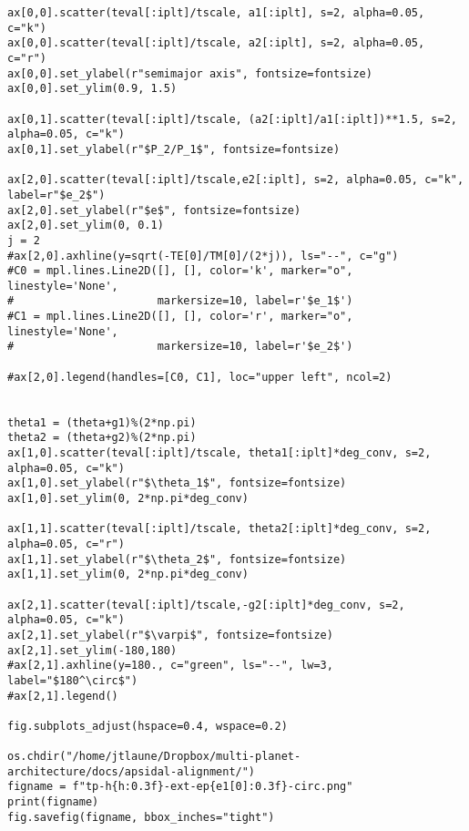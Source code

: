 \documentclass[11pt]{article}
\begin{document}
\begin{verbatim}
ax[0,0].scatter(teval[:iplt]/tscale, a1[:iplt], s=2, alpha=0.05, c="k")
ax[0,0].scatter(teval[:iplt]/tscale, a2[:iplt], s=2, alpha=0.05, c="r")
ax[0,0].set_ylabel(r"semimajor axis", fontsize=fontsize)
ax[0,0].set_ylim(0.9, 1.5)

ax[0,1].scatter(teval[:iplt]/tscale, (a2[:iplt]/a1[:iplt])**1.5, s=2, alpha=0.05, c="k")
ax[0,1].set_ylabel(r"$P_2/P_1$", fontsize=fontsize)

ax[2,0].scatter(teval[:iplt]/tscale,e2[:iplt], s=2, alpha=0.05, c="k", label=r"$e_2$")
ax[2,0].set_ylabel(r"$e$", fontsize=fontsize)
ax[2,0].set_ylim(0, 0.1)
j = 2
#ax[2,0].axhline(y=sqrt(-TE[0]/TM[0]/(2*j)), ls="--", c="g")
#C0 = mpl.lines.Line2D([], [], color='k', marker="o", linestyle='None',
#                      markersize=10, label=r'$e_1$')
#C1 = mpl.lines.Line2D([], [], color='r', marker="o", linestyle='None',
#                      markersize=10, label=r'$e_2$')

#ax[2,0].legend(handles=[C0, C1], loc="upper left", ncol=2)


theta1 = (theta+g1)%(2*np.pi)
theta2 = (theta+g2)%(2*np.pi)
ax[1,0].scatter(teval[:iplt]/tscale, theta1[:iplt]*deg_conv, s=2, alpha=0.05, c="k")
ax[1,0].set_ylabel(r"$\theta_1$", fontsize=fontsize)
ax[1,0].set_ylim(0, 2*np.pi*deg_conv)

ax[1,1].scatter(teval[:iplt]/tscale, theta2[:iplt]*deg_conv, s=2, alpha=0.05, c="r")
ax[1,1].set_ylabel(r"$\theta_2$", fontsize=fontsize)
ax[1,1].set_ylim(0, 2*np.pi*deg_conv)

ax[2,1].scatter(teval[:iplt]/tscale,-g2[:iplt]*deg_conv, s=2, alpha=0.05, c="k")
ax[2,1].set_ylabel(r"$\varpi$", fontsize=fontsize)
ax[2,1].set_ylim(-180,180)
#ax[2,1].axhline(y=180., c="green", ls="--", lw=3, label="$180^\circ$")
#ax[2,1].legend()

fig.subplots_adjust(hspace=0.4, wspace=0.2)

os.chdir("/home/jtlaune/Dropbox/multi-planet-architecture/docs/apsidal-alignment/")
figname = f"tp-h{h:0.3f}-ext-ep{e1[0]:0.3f}-circ.png"
print(figname)
fig.savefig(figname, bbox_inches="tight")
\end{verbatim}
\end{document}
